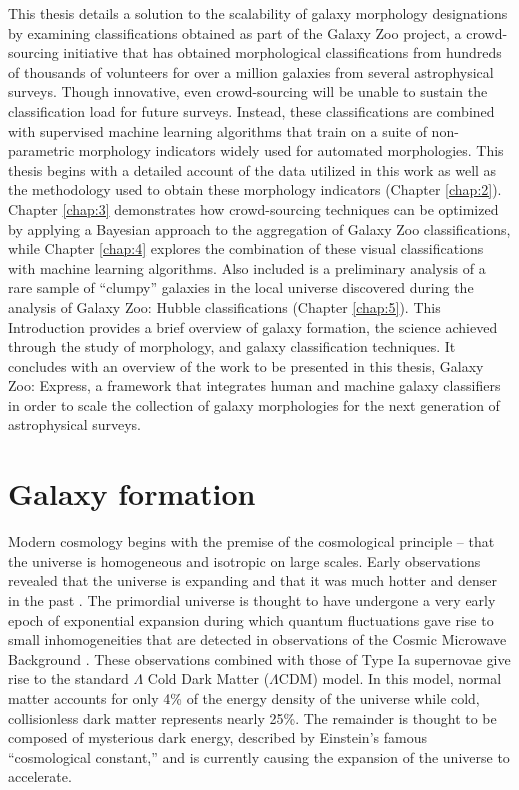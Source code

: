 This thesis details a solution to the scalability of galaxy morphology designations by examining classifications obtained as part of the Galaxy Zoo project, a crowd-sourcing initiative that has obtained morphological classifications from hundreds of thousands of volunteers for over a million galaxies from several astrophysical surveys. Though innovative, even crowd-sourcing will be unable to sustain the classification load for future surveys. Instead, these classifications are combined with supervised machine learning algorithms that train on a suite of non-parametric morphology indicators widely used for automated morphologies. This thesis begins with a detailed account of the data utilized in this work as well as the methodology used to obtain these morphology indicators (Chapter \ref{chap:2}). Chapter \ref{chap:3} demonstrates how crowd-sourcing techniques can be optimized by applying a Bayesian approach to the aggregation of Galaxy Zoo classifications, while Chapter \ref{chap:4} explores the combination of these visual classifications with machine learning algorithms. Also included is a preliminary analysis of a rare sample of ``clumpy'' galaxies in the local universe discovered during the analysis of Galaxy Zoo: Hubble classifications (Chapter \ref{chap:5}). This Introduction provides a brief overview of galaxy formation, the science achieved through the study of morphology, and galaxy classification techniques. It concludes with an overview of the work to be presented in this thesis, Galaxy Zoo: Express, a framework that integrates human and machine galaxy classifiers in order to scale the collection of galaxy morphologies for the next generation of astrophysical surveys. 


\section{Galaxy formation}
\label{chap1: galaxy formation}

Modern cosmology begins with the premise of the cosmological principle -- that the universe is homogeneous and isotropic on large scales. Early observations revealed that the universe is expanding \citep{Hubble1929,Hubble1931} and that it was much hotter and denser in the past \citep{Penzias1965,Dicke1965}.  The primordial universe is thought to have undergone a very early epoch of exponential expansion \citep{Guth1981} during which quantum fluctuations gave rise to small inhomogeneities that are detected in observations of the Cosmic Microwave Background \citep{Hinshaw2013,Planck2016}. These observations combined with those of Type Ia supernovae \citep{Riess1998,Perlmutter1998} give rise to the standard $\Lambda$ Cold Dark Matter ($\Lambda$CDM) model. In this model, normal matter accounts for only 4\% of the energy density of the universe while cold, collisionless dark matter represents nearly 25\%. The remainder is thought to be composed of mysterious dark energy, described by Einstein's famous ``cosmological constant,'' and is currently causing the expansion of the universe to accelerate.


